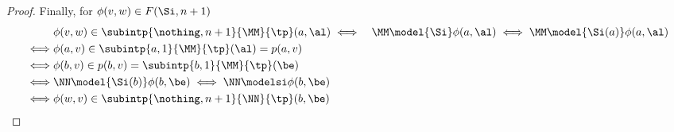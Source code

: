 \begin{proof}
    Finally, for $\phi(v,w) \in F(\Si,n+1)$
    \begin{align*}
        &\phi(v,w) \in \subintp{\nothing,n+1}{\MM}{\tp}(a,\al)
        \iff &\MM \model{\Si} \phi(a,\al) \iff \MM \model{\Si(a)} \phi(a,\al)\\
        \iff &\phi(a,v) \in \subintp{a,1}{\MM}{\tp}(\al) = p(a,v)\\
        \iff &\phi(b,v) \in p(b,v) = \subintp{b,1}{\MM}{\tp}(\be)\\
        \iff &\NN \model{\Si(b)} \phi(b,\be) \iff \NN \modelsi \phi(b,\be)\\
        \iff &\phi(w,v) \in \subintp{\nothing,n+1}{\NN}{\tp}(b,\be)
    \end{align*}
\end{proof}



